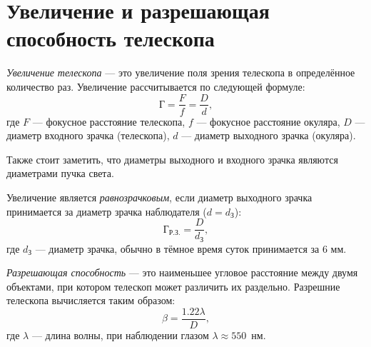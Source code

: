 \section{Увеличение и разрешающая способность телескопа}
\textit{Увеличение телескопа} --- это увеличение поля зрения телескопа в определённое количество раз. Увеличение рассчитывается по следующей формуле:
\begin{equation}
\text{Г}=\frac{F}{f}=\frac{D}{d},
\end{equation}
где $F$ --- фокусное расстояние телескопа, $f$ --- фокусное расстояние окуляра, $D$ --- диаметр входного зрачка (телескопа), $d$ --- диаметр выходного зрачка (окуляра).

Также стоит заметить, что диаметры выходного и входного зрачка являются диаметрами пучка света.

Увеличение является \textit{равнозрачковым}, если диаметр выходного зрачка принимается за диаметр зрачка наблюдателя ($d=d_{\text{З}}$):
\begin{equation}
\text{Г}_{\text{Р.З.}}=\frac{D}{d_{\text{З}}},
\end{equation}
где $d_{\text{З}}$ --- диаметр зрачка, обычно в тёмное время суток принимается за 6 мм.

\textit{Разрешающая способность} --- это наименьшее угловое расстояние между двумя объектами, при котором телескоп может различить их раздельно. Разрешние телескопа вычисляется таким образом:
\begin{equation}
\beta=\frac{1.22\lambda}{D},
\end{equation}
где $\lambda$ --- длина волны, при наблюдении глазом $\lambda\approx 550$~нм.